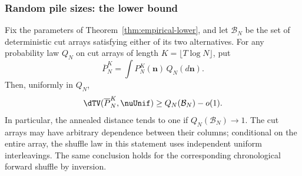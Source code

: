 \subsubsection{Random pile sizes: the lower bound}

\begin{corollary}
\label{cor:lower-random}
Fix the parameters of Theorem~\ref{thm:empirical-lower}, and let
$\mathcal B_N$ be the set of deterministic cut arrays satisfying
either of its two alternatives. For any probability law $Q_N$ on
cut arrays of length $K=\lfloor T\log N\rfloor$, put
\[
 \overline P_N^K=\int P_N^K(\mathbf n)\,Q_N(d\mathbf n).
\]
Then, uniformly in $Q_N$,
\[
 \dTV(\overline P_N^K,\nuUnif)\ge Q_N(\mathcal B_N)-o(1).
\]
In particular, the annealed distance tends to one if
$Q_N(\mathcal B_N)\to1$. The cut arrays may have arbitrary
dependence between their columns; conditional on the entire array,
the shuffle law in this statement uses independent uniform
interleavings. The same conclusion holds for the corresponding
chronological forward shuffle by inversion.
\end{corollary}

